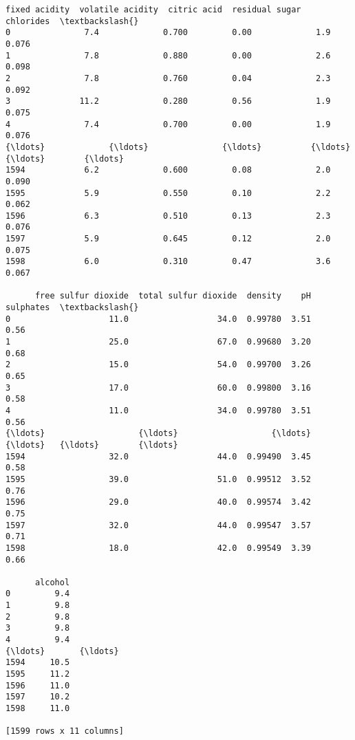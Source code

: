 \documentclass[11pt]{article}
\makeatletter
\newcommand{\boxspacing}{\kern\kvtcb@left@rule\kern\kvtcb@boxsep}
\newcommand{\prompt}[4]{
        {\ttfamily\llap{{\color{#2}[#3]:\hspace{3pt}#4}}\vspace{-\baselineskip}}
    }
\makeatother
\begin{document}
            \begin{tcolorbox}[breakable, size=fbox, boxrule=.5pt, pad at break*=1mm, opacityfill=0]
\prompt{Out}{outcolor}{11}{\boxspacing}
\begin{Verbatim}[commandchars=\\\{\}]
      fixed acidity  volatile acidity  citric acid  residual sugar  chlorides  \textbackslash{}
0               7.4             0.700         0.00             1.9      0.076
1               7.8             0.880         0.00             2.6      0.098
2               7.8             0.760         0.04             2.3      0.092
3              11.2             0.280         0.56             1.9      0.075
4               7.4             0.700         0.00             1.9      0.076
{\ldots}             {\ldots}               {\ldots}          {\ldots}             {\ldots}        {\ldots}
1594            6.2             0.600         0.08             2.0      0.090
1595            5.9             0.550         0.10             2.2      0.062
1596            6.3             0.510         0.13             2.3      0.076
1597            5.9             0.645         0.12             2.0      0.075
1598            6.0             0.310         0.47             3.6      0.067

      free sulfur dioxide  total sulfur dioxide  density    pH  sulphates  \textbackslash{}
0                    11.0                  34.0  0.99780  3.51       0.56
1                    25.0                  67.0  0.99680  3.20       0.68
2                    15.0                  54.0  0.99700  3.26       0.65
3                    17.0                  60.0  0.99800  3.16       0.58
4                    11.0                  34.0  0.99780  3.51       0.56
{\ldots}                   {\ldots}                   {\ldots}      {\ldots}   {\ldots}        {\ldots}
1594                 32.0                  44.0  0.99490  3.45       0.58
1595                 39.0                  51.0  0.99512  3.52       0.76
1596                 29.0                  40.0  0.99574  3.42       0.75
1597                 32.0                  44.0  0.99547  3.57       0.71
1598                 18.0                  42.0  0.99549  3.39       0.66

      alcohol
0         9.4
1         9.8
2         9.8
3         9.8
4         9.4
{\ldots}       {\ldots}
1594     10.5
1595     11.2
1596     11.0
1597     10.2
1598     11.0

[1599 rows x 11 columns]
\end{Verbatim}
\end{tcolorbox}
        
\end{document}
